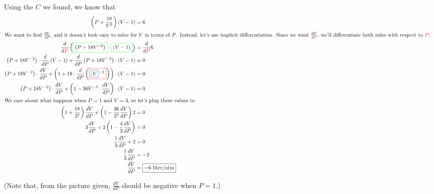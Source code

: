 \documentclass{article}
\begin{document}
\begin{enumerate}
\begin{enumerate}
    \begin{solution}
      Using the $C$ we found, we know that
      \begin{align*}
        \left(P + \frac{18}{V^2}\right) (V-1) &= 6 \\
        \intertext{We want to find $\frac{dV}{dP}$, and it doesn't look
          easy to solve for $V$ in terms of $P$.  Instead, let's use
          implicit differentiation.  Since we want
          $\frac{dV}{d\color{red}P\color{black}}$, we'll differentiate
          both sides with respect to \color{red}$P$\color{black}:}
        \frac{d}{d\color{red}P\color{black}}
        \left(\fcolorbox{green}{white}{$\displaystyle  \left(P+ 18 V^ {
                -2} \right)$}\cdot
          \fcolorbox{green}{white}{$\displaystyle
            \left(V-1\right)$}\right) &=
        \frac{d}{d\color{red}P\color{black}} 6\\
        \left(P+ 18 V^ { -2} \right)\cdot \frac{d}{dP}\left(V-1\right)+
        \frac{d}{dP}\left(P+ 18 V^ { -2} \right)\cdot \left(V-1\right) &=
        0 \\
        \left(P+ 18 V^ { -2} \right)\cdot \frac{dV}{dP}+ \left(1+ 18\cdot
          \frac{d}{dP} \left(\fcolorbox{red}{white}{$\displaystyle
              \fcolorbox{blue}{white}{$\displaystyle  V$}^ { -2}
              $}\right)\right)\cdot \left(V-1\right) &= 0 \\
        \left(P+ 18 V^ { -2} \right)\cdot \frac{dV}{dP}+ \left(1-36 V^ {
            -3} \cdot \frac{dV}{dP}\right)\cdot \left(V-1\right) &= 0 \\
        \intertext{We care about what happens when $P = 1$ and $V = 3$, so
          let's plug these values in:} \left( 1 + \frac{18}{3^2} \right)
        \frac{dV}{dP} + \left(1 -
          \frac{36}{3^3} \frac{dV}{dP} \right) 2 &= 0 \\
        3 \frac{dV}{dP} + 2 \left( 1 - \frac{4}{3} \frac{dV}{dP} \right) &= 0 \\
        \frac{1}{3} \frac{dV}{dP} + 2 &= 0 \\
        \frac{1}{3} \frac{dV}{dP} &= -2 \\
        \frac{dV}{dP} &= \boxed{-6\text{ liter/atm}}
      \end{align*}

      (Note that, from the picture given, $\frac{dV}{dP}$ should be
      negative when $P = 1$.)
    \end{solution}



\end{enumerate}
\end{enumerate}
\end{document}
